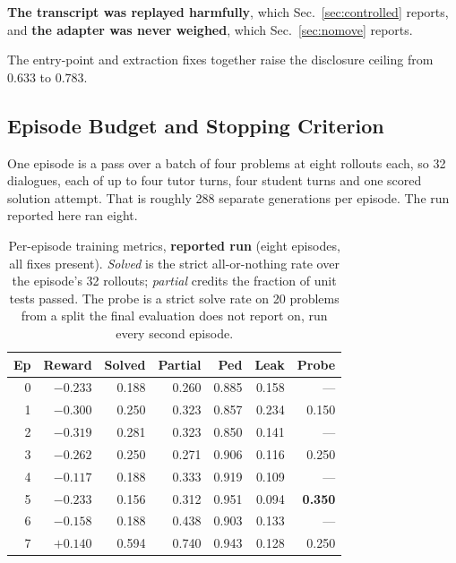 \documentclass[conference]{IEEEtran}
\begin{document}
\textbf{The transcript was replayed harmfully}, which Sec.~\ref{sec:controlled}
reports, and \textbf{the adapter was never weighed}, which
Sec.~\ref{sec:nomove} reports.

The entry-point and extraction fixes together raise the disclosure ceiling from
$0.633$ to $0.783$.

\subsection{Episode Budget and Stopping Criterion}
\label{sec:episodes}

One episode is a pass over a batch of four problems at eight rollouts each, so
32 dialogues, each of up to four tutor turns, four student turns and one scored
solution attempt. That is roughly 288 separate generations per episode. The run
reported here ran eight.

\begin{table}[t]
\caption{Per-episode training metrics, \textbf{reported run} (eight episodes, all fixes present). \emph{Solved} is
the strict all-or-nothing rate over the episode's 32 rollouts; \emph{partial}
credits the fraction of unit tests passed. The probe is a strict solve rate on
20 problems from a split the final evaluation does not report on, run every
second episode.}
\label{tab:episodes}
\centering
\small
\begin{tabular}{rrrrrrr}
\toprule
\textbf{Ep} & \textbf{Reward} & \textbf{Solved} & \textbf{Partial} &
\textbf{Ped} & \textbf{Leak} & \textbf{Probe} \\
\midrule
0 & $-0.233$ & 0.188 & 0.260 & 0.885 & 0.158 & --- \\
1 & $-0.300$ & 0.250 & 0.323 & 0.857 & 0.234 & 0.150 \\
2 & $-0.319$ & 0.281 & 0.323 & 0.850 & 0.141 & --- \\
3 & $-0.262$ & 0.250 & 0.271 & 0.906 & 0.116 & 0.250 \\
4 & $-0.117$ & 0.188 & 0.333 & 0.919 & 0.109 & --- \\
5 & $-0.233$ & 0.156 & 0.312 & 0.951 & 0.094 & \textbf{0.350} \\
6 & $-0.158$ & 0.188 & 0.438 & 0.903 & 0.133 & --- \\
7 & $+0.140$ & 0.594 & 0.740 & 0.943 & 0.128 & 0.250 \\
\bottomrule
\end{tabular}
\end{table}
\end{document}
